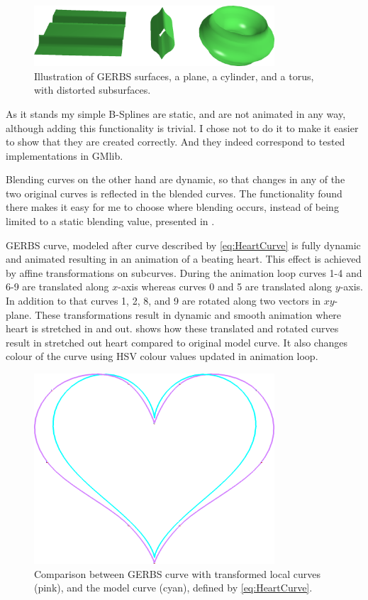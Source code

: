 \documentclass[a4paper,12pt]{extarticle}
\begin{document}
\begin{figure}[H]
\centering
\includegraphics[width=0.8\textwidth]{GERBSSurfaces.png}
\caption{Illustration of GERBS surfaces, a plane, a cylinder, and a torus, with distorted subsurfaces.}
\label{fig:GERBSSurface}
\end{figure}

As it stands my simple B-Splines are static, and are not animated in any way, although adding this functionality is trivial. I chose not to do it to make it easier to show that they are created correctly. And they indeed correspond to tested implementations in GMlib.

Blending curves on the other hand are dynamic, so that changes in any of the two original curves is reflected in the blended curves. The functionality found there makes it easy for me to choose where blending occurs, instead of being limited to a static blending value, presented in \citep[Chapter 6.2.2]{Laksa2012}.

GERBS curve, modeled after curve described by \cref{eq:HeartCurve} is fully dynamic and animated resulting in an animation of a beating heart. This effect is achieved by affine transformations on subcurves. During the animation loop curves 1-4 and 6-9 are translated along $x$-axis whereas curves 0 and 5 are translated along $y$-axis. In addition to that curves 1, 2, 8, and 9 are rotated along two vectors in $xy$-plane. These transformations result in dynamic and smooth animation where heart is stretched in and out.   shows how these translated and rotated curves result in stretched out heart compared to original model curve. It also changes colour of the curve using HSV colour values updated in animation loop.

\begin{figure}[H]
  \centering
  \includegraphics[width=0.8\textwidth]{CurveComparison.png}
  \caption{Comparison between GERBS curve with transformed local curves (pink), and the model curve (cyan), defined by \cref{eq:HeartCurve}.}
  \label{fig:CurveComparison}
\end{figure}
\end{document}
